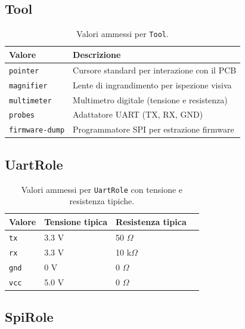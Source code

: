 \subsection{Tool}

\begin{table}[H]
\centering
\begin{tabularx}{\textwidth}{lX}
\toprule
\textbf{Valore} & \textbf{Descrizione} \\
\midrule
\texttt{pointer} & Cursore standard per interazione con il PCB \\
\texttt{magnifier} & Lente di ingrandimento per ispezione visiva \\
\texttt{multimeter} & Multimetro digitale (tensione e resistenza) \\
\texttt{probes} & Adattatore UART (TX, RX, GND) \\
\texttt{firmware-dump} & Programmatore SPI per estrazione firmware \\
\bottomrule
\end{tabularx}
\caption{Valori ammessi per \texttt{Tool}.}
\label{tab:tool}
\end{table}

\subsection{UartRole}

\begin{table}[H]
\centering
\begin{tabular}{llll}
\toprule
\textbf{Valore} & \textbf{Tensione tipica} & \textbf{Resistenza tipica} \\
\midrule
\texttt{tx} & 3.3 V & 50 $\Omega$ \\
\texttt{rx} & 3.3 V & 10 k$\Omega$ \\
\texttt{gnd} & 0 V & 0 $\Omega$ \\
\texttt{vcc} & 5.0 V & 0 $\Omega$ \\
\bottomrule
\end{tabular}
\caption{Valori ammessi per \texttt{UartRole} con tensione e resistenza tipiche.}
\label{tab:uart-role}
\end{table}

\subsection{SpiRole}

